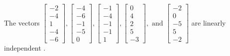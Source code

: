 \begin{exercise}
\begin{exerciseStatement}
  \end{exerciseStatement}
  \begin{exerciseAnswer}
   The vectors \(\left[\begin{array}{r}
-2 \\
-4 \\
1 \\
-4 \\
-6
\end{array}\right] , \left[\begin{array}{r}
-4 \\
-6 \\
-1 \\
-5 \\
0
\end{array}\right] , \left[\begin{array}{r}
-1 \\
-4 \\
-1 \\
-1 \\
1
\end{array}\right] , \left[\begin{array}{r}
0 \\
4 \\
2 \\
5 \\
-3
\end{array}\right] , \text{ and } \left[\begin{array}{r}
-2 \\
0 \\
-5 \\
5 \\
-2
\end{array}\right]\) are 
  	 linearly independent  .
  


  \end{exerciseAnswer}
\end{exercise}